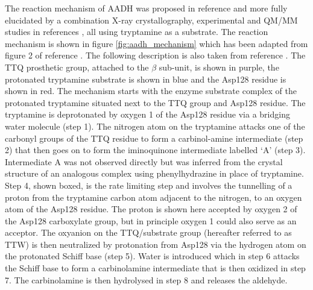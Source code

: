 The reaction mechanism of AADH was proposed in reference \cite{hyunMechanisticStudiesAromatic1995a} and more fully elucidated by a combination X-ray crystallography, experimental and QM/MM studies in references \cite{masgrauAtomicDescriptionEnzyme2006,masgrauTunnelingClassicalPaths2007}, all using tryptamine as a substrate. 
The reaction mechanism is shown in figure \ref{fig:aadh_mechanism} which has been adapted from figure 2 of reference \cite{masgrauAtomicDescriptionEnzyme2006}. The following description is also taken from reference \cite{masgrauAtomicDescriptionEnzyme2006}. The TTQ prosthetic group, attached to the $\beta$ sub-unit, is shown in purple, the protonated tryptamine substrate is shown in blue and the Asp128 residue is shown in red.  The mechanism starts with the enzyme substrate complex of the protonated tryptamine situated next to the TTQ group and Asp128 residue. The tryptamine is deprotonated by oxygen 1 of the Asp128 residue via a bridging water molecule (step 1). The nitrogen atom on the tryptamine attacks one of the carbonyl groups of the TTQ residue to form a carbinol-amine intermediate (step 2) that then goes on to form the iminoquinone intermediate labelled `A' (step 3). Intermediate A was not observed directly but was inferred from the crystal structure of an analogous complex using phenylhydrazine in place of tryptamine. Step 4, shown boxed, is the rate limiting step and involves the tunnelling of a proton from the tryptamine carbon atom adjacent to the nitrogen, to an oxygen atom of the Asp128 residue.  The proton is shown here accepted by oxygen 2 of the Asp128 carboxylate group, but in principle oxygen 1 could also serve as an acceptor. The oxyanion on the TTQ/substrate group (hereafter referred to as TTW) is then neutralized by protonation from Asp128 via the hydrogen atom on the protonated Schiff base (step 5). Water is introduced which in step 6 attacks the Schiff base to form a carbinolamine intermediate that is then oxidized in step 7.  The carbinolamine is then hydrolysed in step 8 and releases the aldehyde.  

